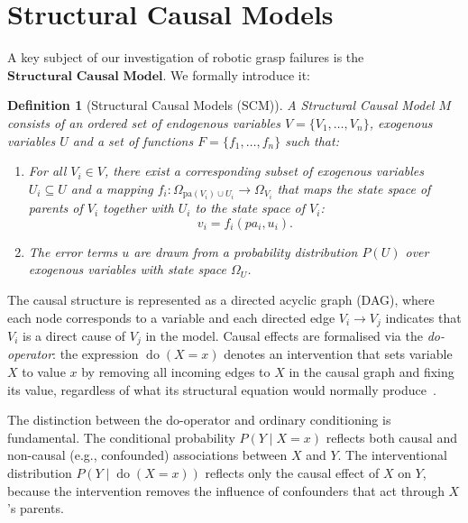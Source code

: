 \documentclass[11pt,a4paper]{report}
\newtheorem{definition}{Definition}[chapter]
\newcommand{\doop}{\operatorname{do}}
\begin{document}
\section{Structural Causal Models}
\label{sec:bg_scm}

A key subject of our investigation of robotic grasp failures is the $\textbf{Structural Causal Model}$. We formally introduce it: 

\begin{definition}[Structural Causal Models (SCM)]
A Structural Causal Model $M$ consists of an ordered set of endogenous variables $V = \{V_1, \ldots, V_n\}$, exogenous variables $U$ and a set of functions $F = \{f_1, \ldots, f_n\}$ such that:
\begin{enumerate}
  \item For all $V_i \in V$, there exist a corresponding subset of exogenous variables $U_i \subseteq U$ and a mapping $f_i : \Omega_{\text{pa}(V_i) \cup U_i} \rightarrow \Omega_{V_i}$ that maps the state space of parents of $V_i$ together with $U_i$ to the state space of $V_i$:
  \[ v_i = f_i(pa_i, u_i). \]
  \item The error terms $u$ are drawn from a probability distribution $P(U)$ over exogenous variables with state space $\Omega_U$.
\end{enumerate}
\end{definition}

The causal structure is represented as a directed acyclic graph (DAG), where each node corresponds to a variable and each directed edge $V_i \to V_j$ indicates that $V_i$ is a direct cause of $V_j$ in the model. Causal effects are formalised via the \emph{do-operator}: the expression $\doop(X = x)$ denotes an intervention that sets variable $X$ to value $x$ by removing all incoming edges to $X$ in the causal graph and fixing its value, regardless of what its structural equation would normally produce~\cite{pearl2009causality}.

The distinction between the do-operator and ordinary conditioning is fundamental. The conditional probability $P(Y \mid X = x)$ reflects both causal and non-causal (e.g., confounded) associations between $X$ and $Y$. The interventional distribution $P(Y \mid \doop(X = x))$ reflects only the causal effect of $X$ on $Y$, because the intervention removes the influence of confounders that act through $X$'s parents.
\end{document}
